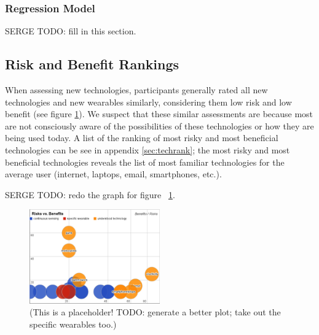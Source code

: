 \documentclass{acm_proc_article-sp}
\begin{document}

\subsubsection{Regression Model} 
{\color{red} SERGE TODO: fill in this section.}

\subsection{Risk and Benefit Rankings} 
When assessing new technologies, participants generally rated all new technologies and new wearables similarly, considering them low risk and low benefit (see figure \ref{fig:techplot}). We suspect that these similar assessments are because most are not consciously aware of the possibilities of these technologies or how they are being used today. A list of the ranking of most risky and most beneficial technologies can be see in appendix \ref{sec:techrank}; the most risky and most beneficial technologies reveals the list of most familiar technologies for the average user (internet, laptops, email, smartphones, etc.). 

{\color{red} SERGE TODO: redo the graph for figure ~\ref{fig:techplot}.}

\begin{figure}
	\centering
	\includegraphics[width=0.5\textwidth]{techplot.png}
	\caption{(This is a placeholder! TODO: generate a better plot; take out the specific wearables too.)}
	\label{fig:techplot}
\end{figure}
\end{document}

